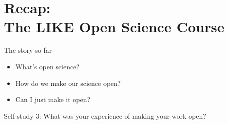 \section[The course]{Recap:\\ The LIKE Open Science Course}
\label{sec:course}

\begin{frame}{The story so far}

\begin{itemize}
    \item What's open science?
    \item How do we make our science open?
    \item Can I just make it open?
\end{itemize}

\pause 

\vspace{1cm}
Self-study 3: What was your experience of making your work open?

\end{frame}



